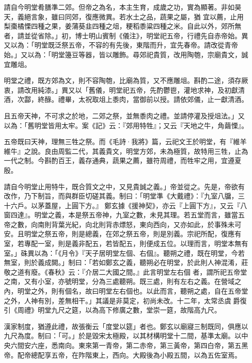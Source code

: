 \begin{pinyinscope}
 請自今明堂肴膳準二郊。但帝之為名，本主生育，成歲之功，實為顯著。非如昊天，義絕言象，雖曰同郊，復應微異。若水土之品，蔬果之屬，猶
 宜以薦，止用梨棗橘慄四種之果，姜蒲葵韭四種之俎，粳稻黍粱四種之米。自此以外，郊所無者，請並從省除。」初，博士明山賓制《儀注》，明堂祀五帝，行禮先自赤帝始。異又以為：「明堂既泛祭五帝，不容的有先後，東階而升，宜先春帝。請改從青帝始。」又以為：「明堂籩豆等器，皆以雕飾。尋郊祀貴質，改用陶匏，宗廟貴文，誠宜雕俎。



 明堂之禮，既方郊為文，則不容陶匏，比廟為質，又不應雕俎。斟酌二途，須存厥衷，請改用純漆。」異又以「舊儀，明堂祀五帝，先酌鬱鬯，灌地求神，及初獻清酒，次酃，終醁。禮畢，太祝取俎上黍肉，當御前以授。請依郊儀，止一獻清酒。



 且五帝天神，不可求之於地，二郊之祭，並無黍肉之禮。並請停灌及授俎法。」又以為：「舊明堂皆用太牢。案《記》云：『郊用特牲』；又云『天地之牛，角繭慄』。



 五帝既曰天神，理無三牲之祭。而《毛詩·我將》篇，云祀文王於明堂，有『維羊維牛』之說。良由周監二代，其義貴文，明堂方郊，未為極質，故特用三牲，止為一代之制。今斟酌百王，義存通典，蔬果之薦，雖符周禮，而牲牢之用，宜遵夏殷。



 請自今明堂止用特牛，既合質文之中，又見貴誠之義。」帝並從之。先是，帝欲有改作，乃下制旨，而與群臣切磋其義。制曰：「明堂準《大戴禮》：『九室八牖，三十六戶。以茅蓋屋，上圓下方。』
 鄭玄據《援神契》，亦云『上圓下方』，又云『八窗四達』。明堂之義，本是祭五帝神，九室之數，未見其理。若五堂而言，雖當五帝之數，向南則背葉光紀，向北則背赤熛怒，東向西向，又亦如此，於事殊未可安。且明堂之祭五帝，則是總義，在郊之祭五帝，則是別義。宗祀所配，復應有室，若專配一室，則是義非配五，若皆配五，則便成五位。以理而言，明堂本無有室。」硃異以為：「《月令》『天子居明堂左個、右個』。聽朔之禮，既在明堂，今若無室，則於義成闕。」制曰：「若如鄭玄之義，聽朔必在明堂，於此則人神混淆，莊敬之道有廢。《春秋》云：『介居二大國之間。』此言明堂左右個
 者，謂所祀五帝堂之南，又有小室，亦號明堂，分為三處聽朔。既三處，則有左右之義。在營域之內，明堂之外，則有個名，故曰明堂左右個也。以此而言，聽朔之處，自在五帝堂之外，人神有別，差無相干。」其議是非莫定，初尚未改。十二年，太常丞虞爵復引《周禮》明堂九尺之筵，以為高下修廣之數，堂崇一筵，故階高九尺。



 漢家制度，猶遵此禮，故張衡云「度堂以筵」者也。鄭玄以廟寢三制既同，俱應以九尺為度。制曰：「可。」於是毀宋太極殿，以其材構明堂十二間，基準太廟。以中央六間安六座，悉南向。東來第一青帝，第二赤帝，第三黃帝，第四白帝，第五黑
 帝。配帝總配享五帝，在阼階東上，西向。大殿後為小殿五間，以為五佐室焉。




\end{pinyinscope}

